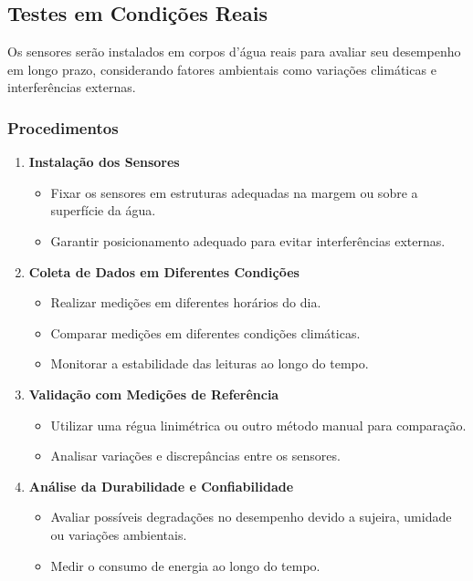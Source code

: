 \subsection{Testes em Condições Reais}
Os sensores serão instalados em corpos d’água reais para avaliar seu desempenho em longo prazo, considerando fatores ambientais como variações climáticas e interferências externas.

\subsubsection{Procedimentos}
\begin{enumerate}
    \item \textbf{Instalação dos Sensores}
    \begin{itemize}
        \item Fixar os sensores em estruturas adequadas na margem ou sobre a superfície da água.
        \item Garantir posicionamento adequado para evitar interferências externas.
    \end{itemize}
    \item \textbf{Coleta de Dados em Diferentes Condições}
    \begin{itemize}
        \item Realizar medições em diferentes horários do dia.
        \item Comparar medições em diferentes condições climáticas.
        \item Monitorar a estabilidade das leituras ao longo do tempo.
    \end{itemize}
    \item \textbf{Validação com Medições de Referência}
    \begin{itemize}
        \item Utilizar uma régua linimétrica ou outro método manual para comparação.
        \item Analisar variações e discrepâncias entre os sensores.
    \end{itemize}
    \item \textbf{Análise da Durabilidade e Confiabilidade}
    \begin{itemize}
        \item Avaliar possíveis degradações no desempenho devido a sujeira, umidade ou variações ambientais.
        \item Medir o consumo de energia ao longo do tempo.
    \end{itemize}
\end{enumerate}

